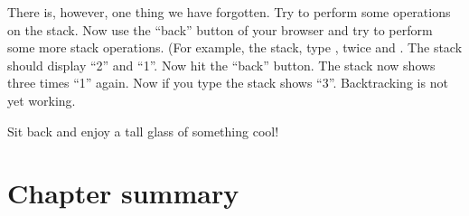 \documentclass[a4paper,10pt,twoside]{book}
\begin{document}
There is, however, one thing we have forgotten.
Try to perform some operations on the stack.
Now use the ``back'' button of your browser and try to perform some more stack operations.
(For example,  the stack, type ,  twice and \menu {+}.
The stack should display ``2'' and ``1''.
Now hit the ``back'' button.
The stack now shows three times ``1'' again.
Now if you type \menu{+} the stack shows ``3''.
Backtracking is not yet working.


Sit back and enjoy a tall glass of something cool!

\section{Chapter summary}
\end{document}
